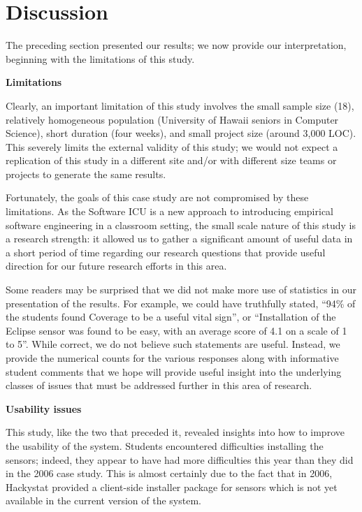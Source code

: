 \documentclass{acm_proc_article-sp}
\begin{document}


\section{Discussion}
\label{sec:discussion}

The preceding section presented our results; we now provide our interpretation, beginning with the limitations of this study.

{\bf Limitations}

Clearly, an important limitation of this study involves the small sample
size (18), relatively homogeneous population (University of Hawaii seniors
in Computer Science), short duration (four weeks), and small project size
(around 3,000 LOC).  This severely limits the external validity of this
study; we would not expect a replication of this study in a different site
and/or with different size teams or projects to generate the same results.

Fortunately, the goals of this case study are not compromised by these
limitations.  As the Software ICU is a new approach to introducing
empirical software engineering in a classroom setting, the small scale nature
of this study is a research strength: it allowed us to gather a significant
amount of useful data in a short period of time regarding our research
questions that provide useful direction for our future research efforts in
this area.

Some readers may be surprised that we did not make more use of statistics
in our presentation of the results.  For example, we could have truthfully
stated, ``94\% of the students found Coverage to be a useful vital sign'',
or ``Installation of the Eclipse sensor was found to be easy, with an
average score of 4.1 on a scale of 1 to 5''.  While correct, we do not
believe such statements are useful. Instead, we provide the numerical
counts for the various responses along with informative student comments
that we hope will provide useful insight into the underlying classes of
issues that must be addressed further in this area of research.

{\bf Usability issues}

This study, like the two that preceded it, revealed insights into how to
improve the usability of the system.  Students encountered difficulties
installing the sensors; indeed, they appear to have had more difficulties
this year than they did in the 2006 case study.  This is almost certainly
due to the fact that in 2006, Hackystat provided a client-side installer
package for sensors which is not yet available in the current version of
the system.
\end{document}
